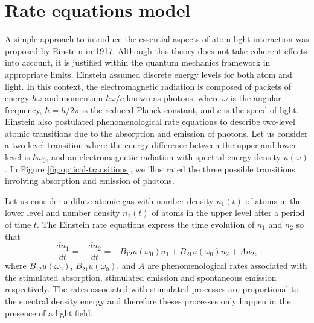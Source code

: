 %
\section{Rate equations model}
\label{sec:rate-equations-model}
%

A simple approach to introduce the essential aspects of atom-light interaction was proposed by Einstein in 1917. Although this theory does not take coherent effects into account, it is justified within the quantum mechanics framework in appropriate limits. Einstein assumed discrete energy levels for both atom and light. In this context, the electromagnetic radiation is composed of packets of energy $ \hbar \omega $ and momentum $ \hbar \omega / c $ known as photons, where $ \omega $ is the angular frequency, $ \hbar = h / 2\pi$ is the reduced Planck constant, and $ c $ is the speed of light. Einstein also postulated phenomenological rate equations to describe two-level atomic transitions due to the absorption and emission of photons. Let us consider a two-level transition where the energy difference between the upper and lower level is $ \hbar \omega_0 $, and an electromagnetic radiation with spectral energy density $ u(\omega) $. In Figure \ref{fig:optical-transitions}, we illustrated the three possible transitions involving absorption and emission of photons.

Let us consider a dilute atomic gas with number density $ n_1(t) $ of atoms in the lower level and number density $ n_2(t) $ of atoms in the upper level after a period of time $ t $. The Einstein rate equations express the time evolution of $ n_1 $ and $ n_2 $ so that
\begin{equation}
	\frac{d n_1}{dt} = - \frac{d n_2}{dt} = - B_{12} u(\omega_0) n_1 + B_{21} u(\omega_0) n_2 + A n_2,
	\label{eq:Einstein-rate-equations}
\end{equation}
where $ B_{12} u(\omega_0) $, $ B_{21} u(\omega_0) $, and $ A $ are phenomenological rates associated with the stimulated absorption, stimulated emission and spontaneous emission respectively. The rates associated with stimulated processes are proportional to the spectral density energy and therefore theses processes only happen in the presence of a light field. 

